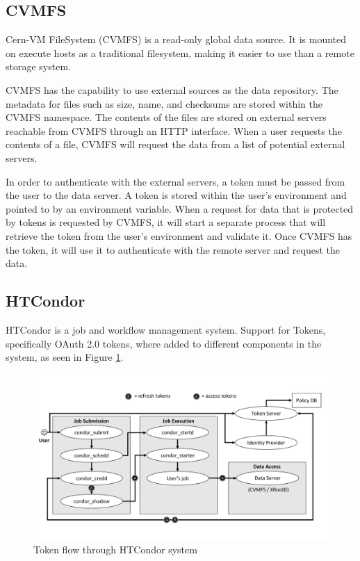 \documentclass{webofc}
\begin{document}
\subsection{CVMFS}
\label{sec:cvmfs}

Cern-VM FileSystem (CVMFS) is a read-only global data source.  It is mounted on execute hosts as a traditional filesystem, making it easier to use than a remote storage system.

CVMFS has the capability to use external sources as the data repository.  The metadata for files such as size, name, and checksums are stored within the CVMFS namespace.  The contents of the files are stored on external servers reachable from CVMFS through an HTTP interface.  When a user requests the contents of a file, CVMFS will request the data from a list of potential external servers.

In order to authenticate with the external servers, a token must be passed from the user to the data server.  A token is stored within the user's environment and pointed to by an environment variable.  When a request for data that is protected by tokens is requested by CVMFS, it will start a separate process that will retrieve the token from the user's environment and validate it.  Once CVMFS has the token, it will use it to authenticate with the remote server and request the data. 

\subsection{HTCondor}
\label{sec:htcondor}

HTCondor is a job and workflow management system.  Support for Tokens, specifically OAuth 2.0 \cite{hardt2012oauth} tokens, where added to different components in the system, as seen in Figure \ref{fig:htcondorflow}.

\begin{figure}[ht]
\includegraphics[width=\textwidth]{images/HTCondorTokenFlow.pdf}
\caption{Token flow through HTCondor system}
\label{fig:htcondorflow}
\end{figure}
\end{document}
